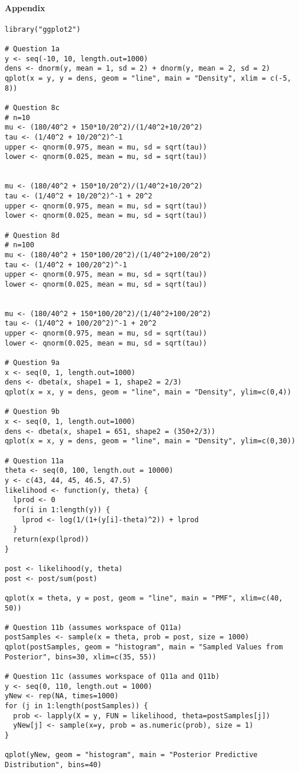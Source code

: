 \documentclass[10pt]{article}
\begin{document}
\paragraph{Appendix}
\begin{Verbatim}
library("ggplot2")

# Question 1a
y <- seq(-10, 10, length.out=1000)
dens <- dnorm(y, mean = 1, sd = 2) + dnorm(y, mean = 2, sd = 2)
qplot(x = y, y = dens, geom = "line", main = "Density", xlim = c(-5, 8))

# Question 8c
# n=10
mu <- (180/40^2 + 150*10/20^2)/(1/40^2+10/20^2)
tau <- (1/40^2 + 10/20^2)^-1
upper <- qnorm(0.975, mean = mu, sd = sqrt(tau))
lower <- qnorm(0.025, mean = mu, sd = sqrt(tau))


mu <- (180/40^2 + 150*10/20^2)/(1/40^2+10/20^2)
tau <- (1/40^2 + 10/20^2)^-1 + 20^2
upper <- qnorm(0.975, mean = mu, sd = sqrt(tau))
lower <- qnorm(0.025, mean = mu, sd = sqrt(tau))

# Question 8d
# n=100
mu <- (180/40^2 + 150*100/20^2)/(1/40^2+100/20^2)
tau <- (1/40^2 + 100/20^2)^-1
upper <- qnorm(0.975, mean = mu, sd = sqrt(tau))
lower <- qnorm(0.025, mean = mu, sd = sqrt(tau))


mu <- (180/40^2 + 150*100/20^2)/(1/40^2+100/20^2)
tau <- (1/40^2 + 100/20^2)^-1 + 20^2
upper <- qnorm(0.975, mean = mu, sd = sqrt(tau))
lower <- qnorm(0.025, mean = mu, sd = sqrt(tau))

# Question 9a
x <- seq(0, 1, length.out=1000)
dens <- dbeta(x, shape1 = 1, shape2 = 2/3)
qplot(x = x, y = dens, geom = "line", main = "Density", ylim=c(0,4))

# Question 9b
x <- seq(0, 1, length.out=1000)
dens <- dbeta(x, shape1 = 651, shape2 = (350+2/3))
qplot(x = x, y = dens, geom = "line", main = "Density", ylim=c(0,30))

# Question 11a
theta <- seq(0, 100, length.out = 10000)
y <- c(43, 44, 45, 46.5, 47.5)
likelihood <- function(y, theta) {
  lprod <- 0
  for(i in 1:length(y)) {
    lprod <- log(1/(1+(y[i]-theta)^2)) + lprod
  }
  return(exp(lprod))
}

post <- likelihood(y, theta)
post <- post/sum(post)

qplot(x = theta, y = post, geom = "line", main = "PMF", xlim=c(40, 50))

# Question 11b (assumes workspace of Q11a)
postSamples <- sample(x = theta, prob = post, size = 1000)
qplot(postSamples, geom = "histogram", main = "Sampled Values from Posterior", bins=30, xlim=c(35, 55))

# Question 11c (assumes workspace of Q11a and Q11b)
y <- seq(0, 110, length.out = 1000)
yNew <- rep(NA, times=1000)
for (j in 1:length(postSamples)) {
  prob <- lapply(X = y, FUN = likelihood, theta=postSamples[j])
  yNew[j] <- sample(x=y, prob = as.numeric(prob), size = 1)
}

qplot(yNew, geom = "histogram", main = "Posterior Predictive Distribution", bins=40)
\end{Verbatim}
\end{document}
